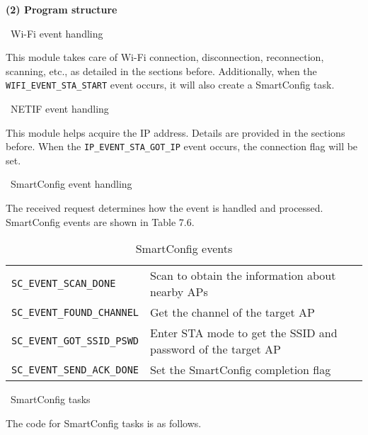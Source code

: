 \documentclass[a4paper,12pt]{book}
\begin{document}
\textbf{(2) Program structure}

\textbullet\ Wi-Fi event handling

This module takes care of Wi-Fi connection, disconnection, reconnection, scanning, etc., as detailed in the sections before. Additionally, when the \verb|WIFI_EVENT_STA_START| event occurs, it will also create a SmartConfig task.

\textbullet\ NETIF event handling

This module helps acquire the IP address. Details are provided in the sections before. When the \verb|IP_EVENT_STA_GOT_IP| event occurs, the connection flag will be set.

\textbullet\ SmartConfig event handling

The received request determines how the event is handled and processed. SmartConfig events are shown in Table 7.6.

\begin{table}[h!]
    \renewcommand{\arraystretch}{1.2}
    \caption{SmartConfig events}
    \begin{tabular}{|>{\small}m{}|>{\small}m{}|}
        \hline
        \rowcolor{LightBlue}\multicolumn{1}{|c|}{\textbf{Event}}&\multicolumn{1}{c|}{\textbf{Description}}\\
        \hline
        \verb|SC_EVENT_SCAN_DONE|&Scan to obtain the information about nearby APs\\
        \hline
        \verb|SC_EVENT_FOUND_CHANNEL|&Get the channel of the target AP\\
        \hline
        \verb|SC_EVENT_GOT_SSID_PSWD|&Enter STA mode to get the SSID and password of the target AP\\
        \hline
        \verb|SC_EVENT_SEND_ACK_DONE|&Set the SmartConfig completion flag\\
        \hline
    \end{tabular}
\end{table}

\textbullet\ SmartConfig tasks

The code for SmartConfig tasks is as follows.
\end{document}
